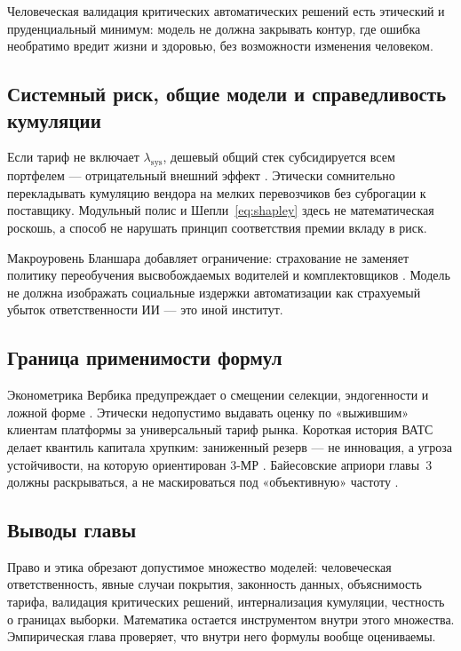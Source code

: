 \documentclass[a4paper,14pt]{extarticle}
\begin{document}
Человеческая валидация критических автоматических решений \cite{cbr} есть этический и пруденциальный минимум: модель не должна закрывать контур, где ошибка необратимо вредит жизни и здоровью, без возможности изменения человеком.

\subsection{Системный риск, общие модели и справедливость кумуляции}

Если тариф не включает $\lambda_{\mathrm{sys}}$, дешевый общий стек субсидируется всем портфелем --- отрицательный внешний эффект \cite{pindyck}. Этически сомнительно перекладывать кумуляцию вендора на мелких перевозчиков без суброгации к поставщику. Модульный полис и Шепли~\eqref{eq:shapley} здесь не математическая роскошь, а способ не нарушать принцип соответствия премии вкладу в риск.

Макроуровень Бланшара добавляет ограничение: страхование не заменяет политику переобучения высвобождаемых водителей и комплектовщиков \cite{blanchard}. Модель не должна изображать социальные издержки автоматизации как страхуемый убыток ответственности ИИ --- это иной институт.

\subsection{Граница применимости формул}

Эконометрика Вербика предупреждает о смещении селекции, эндогенности и ложной форме \cite{verbeek}. Этически недопустимо выдавать оценку по «выжившим» клиентам платформы за универсальный тариф рынка. Короткая история ВАТС делает квантиль капитала хрупким: заниженный резерв --- не инновация, а угроза устойчивости, на которую ориентирован 3-МР \cite{cbr}. Байесовские априори главы~3 должны раскрываться, а не маскироваться под «объективную» частоту \cite{shvedov}.

\subsection{Выводы главы}

Право и этика обрезают допустимое множество моделей: человеческая ответственность, явные случаи покрытия, законность данных, объяснимость тарифа, валидация критических решений, интернализация кумуляции, честность о границах выборки. Математика остается инструментом внутри этого множества. Эмпирическая глава проверяет, что внутри него формулы вообще оцениваемы.
\end{document}
